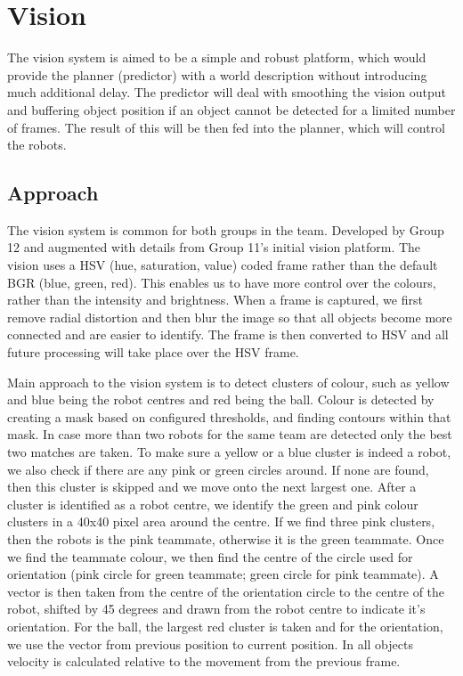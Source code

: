 \section{Vision}

The vision system is aimed to be a simple and robust platform, which would provide the planner (predictor) with a world description without introducing much additional delay. The predictor will deal with smoothing the vision output and buffering object position if an object cannot be detected for a limited number of frames. The result of this will be then fed into the planner, which will control the robots.

\subsection{Approach}

The vision system is common for both groups in the team. Developed by Group 12 and augmented with details from Group 11's initial vision platform. The vision uses a HSV (hue, saturation, value) coded frame rather than the default BGR (blue, green, red). This enables us to have more control over the colours, rather than the intensity and brightness. When a frame is captured, we first remove radial distortion and then blur the image so that all objects become more connected and are easier to identify. The frame is then converted to HSV and all future processing will take place over the HSV frame.

Main approach to the vision system is to detect clusters of colour, such as yellow and blue being the robot centres and red being the ball. Colour is detected by creating a mask based on configured thresholds, and finding contours within that mask. In case more than two robots for the same team are detected only the best two matches are taken. To make sure a yellow or a blue cluster is indeed a robot, we also check if there are any pink or green circles around. If none are found, then this cluster is skipped and we move onto the next largest one. After a cluster is identified as a robot centre, we identify the green and pink colour clusters in a 40x40 pixel area around the centre. If we find three pink clusters, then the robots is the pink teammate, otherwise it is the green teammate. Once we find the teammate colour, we then find the centre of the circle used for orientation (pink circle for green teammate; green circle for pink teammate). A vector is then taken from the centre of the orientation circle to the centre of the robot, shifted by 45 degrees and drawn from the robot centre to indicate it’s orientation. For the ball, the largest red cluster is taken and for the orientation, we use the vector from previous position to current position. In all objects velocity is calculated relative to the movement from the previous frame. 

